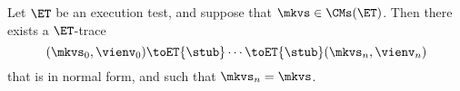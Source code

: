 \begin{proposition}
\label{prop:et.normalform}
Let $\ET$ be an execution test, and suppose that $\mkvs \in \CMs(\ET)$. Then there exists a $\ET$-trace  
\[
(\mkvs_0, \vienv_0) \toET{\stub} \cdots \toET{\stub} (\mkvs_n, \vienv_{n})
\]
that is in normal form, and such that $\mkvs_{n} = \mkvs$.
\end{proposition}
%
%
%
%
